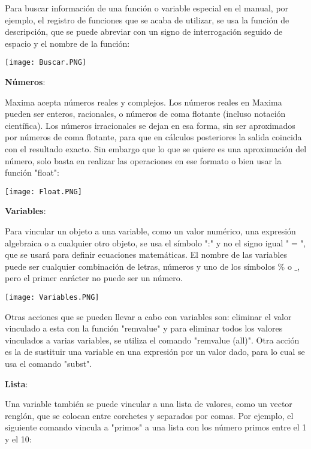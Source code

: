 \documentclass{article}
\begin{document}
Para buscar información de una función o variable especial en el manual, por ejemplo, el registro de funciones que se acaba de utilizar, se usa la función de descripción, que se puede abreviar con un signo de interrogación seguido de espacio y el nombre de la función:

\begin{center}
\texttt{[image: Buscar.PNG]}
\end{center}

\textbf{Números}:

Maxima acepta números reales y complejos. Los números reales en Maxima pueden ser enteros, racionales, o números de coma flotante (incluso notación científica). Los números irracionales se dejan en esa forma, sin ser aproximados por números de coma flotante, para que en cálculos posteriores la salida coincida con el resultado exacto. Sin embargo que lo que se quiere es una aproximación del número, solo basta en realizar las operaciones en ese formato o bien usar la función "float":

\begin{center}
\texttt{[image: Float.PNG]}
\end{center}

\textbf{Variables}:

Para vincular un objeto a una variable, como un valor numérico, una expresión algebraica o a cualquier otro objeto, se usa el símbolo ":" y no el signo igual "$=$", que se usará para definir ecuaciones matemáticas. El nombre de las variables puede ser cualquier combinación de letras, números y uno de los símbolos $\%$ o $\_$, pero el primer carácter no puede ser un número.
\begin{center}
\texttt{[image: Variables.PNG]}
\end{center}

Otras acciones que se pueden llevar a cabo con variables son: eliminar el valor vinculado a esta con la función "remvalue" y para eliminar todos los valores vinculados a varias variables, se utiliza el comando "remvalue (all)". Otra acción es la de sustituir una variable en una expresión por un valor dado, para lo cual se usa el comando "subst".

\textbf{Lista}:

Una variable también se puede vincular a una lista de valores, como un vector renglón, que se colocan entre corchetes y separados por comas. Por ejemplo, el siguiente comando vincula a "primos" a una lista con los número primos entre el 1 y el 10:
\end{document}
